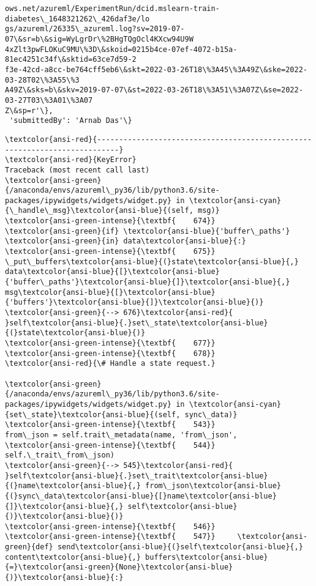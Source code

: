 \documentclass[11pt]{article}
\begin{document}
\begin{tcolorbox}[breakable, size=fbox, boxrule=.5pt, pad at break*=1mm, opacityfill=0]
\begin{Verbatim}[commandchars=\\\{\}]
ows.net/azureml/ExperimentRun/dcid.mslearn-train-diabetes\_1648321262\_426daf3e/lo
gs/azureml/26335\_azureml.log?sv=2019-07-07\&sr=b\&sig=WyLgrDr\%2BHgTQgOcl4KXcw94U9W
4xZlt3pwFLOKuC9MU\%3D\&skoid=0215b4ce-07ef-4072-b15a-81ec4251c34f\&sktid=63ce7d59-2
f3e-42cd-a8cc-be764cff5eb6\&skt=2022-03-26T18\%3A45\%3A49Z\&ske=2022-03-28T02\%3A55\%3
A49Z\&sks=b\&skv=2019-07-07\&st=2022-03-26T18\%3A51\%3A07Z\&se=2022-03-27T03\%3A01\%3A07
Z\&sp=r'\},
 'submittedBy': 'Arnab Das'\}
\end{Verbatim}
\end{tcolorbox}
        
    \begin{Verbatim}[commandchars=\\\{\}, frame=single, framerule=2mm, rulecolor=\color{outerrorbackground}]
\textcolor{ansi-red}{---------------------------------------------------------------------------}
\textcolor{ansi-red}{KeyError}                                  Traceback (most recent call last)
\textcolor{ansi-green}{/anaconda/envs/azureml\_py36/lib/python3.6/site-packages/ipywidgets/widgets/widget.py} in \textcolor{ansi-cyan}{\_handle\_msg}\textcolor{ansi-blue}{(self, msg)}
\textcolor{ansi-green-intense}{\textbf{    674}}                 \textcolor{ansi-green}{if} \textcolor{ansi-blue}{'buffer\_paths'} \textcolor{ansi-green}{in} data\textcolor{ansi-blue}{:}
\textcolor{ansi-green-intense}{\textbf{    675}}                     \_put\_buffers\textcolor{ansi-blue}{(}state\textcolor{ansi-blue}{,} data\textcolor{ansi-blue}{[}\textcolor{ansi-blue}{'buffer\_paths'}\textcolor{ansi-blue}{]}\textcolor{ansi-blue}{,} msg\textcolor{ansi-blue}{[}\textcolor{ansi-blue}{'buffers'}\textcolor{ansi-blue}{]}\textcolor{ansi-blue}{)}
\textcolor{ansi-green}{--> 676}\textcolor{ansi-red}{                 }self\textcolor{ansi-blue}{.}set\_state\textcolor{ansi-blue}{(}state\textcolor{ansi-blue}{)}
\textcolor{ansi-green-intense}{\textbf{    677}} 
\textcolor{ansi-green-intense}{\textbf{    678}}         \textcolor{ansi-red}{\# Handle a state request.}

\textcolor{ansi-green}{/anaconda/envs/azureml\_py36/lib/python3.6/site-packages/ipywidgets/widgets/widget.py} in \textcolor{ansi-cyan}{set\_state}\textcolor{ansi-blue}{(self, sync\_data)}
\textcolor{ansi-green-intense}{\textbf{    543}}                     from\_json = self.trait\_metadata(name, 'from\_json',
\textcolor{ansi-green-intense}{\textbf{    544}}                                                     self.\_trait\_from\_json)
\textcolor{ansi-green}{--> 545}\textcolor{ansi-red}{                     }self\textcolor{ansi-blue}{.}set\_trait\textcolor{ansi-blue}{(}name\textcolor{ansi-blue}{,} from\_json\textcolor{ansi-blue}{(}sync\_data\textcolor{ansi-blue}{[}name\textcolor{ansi-blue}{]}\textcolor{ansi-blue}{,} self\textcolor{ansi-blue}{)}\textcolor{ansi-blue}{)}
\textcolor{ansi-green-intense}{\textbf{    546}} 
\textcolor{ansi-green-intense}{\textbf{    547}}     \textcolor{ansi-green}{def} send\textcolor{ansi-blue}{(}self\textcolor{ansi-blue}{,} content\textcolor{ansi-blue}{,} buffers\textcolor{ansi-blue}{=}\textcolor{ansi-green}{None}\textcolor{ansi-blue}{)}\textcolor{ansi-blue}{:}


\end{Verbatim}
\end{document}
